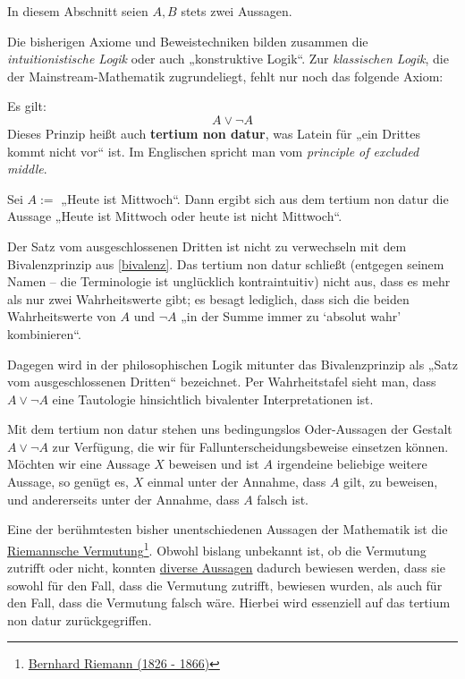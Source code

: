 In diesem Abschnitt seien $A,B$ stets zwei Aussagen.

Die bisherigen Axiome und Beweistechniken bilden zusammen die \emph{intuitionistische Logik} oder auch „konstruktive Logik“. Zur \emph{klassischen Logik}, die der Mainstream-Mathematik zugrundeliegt, fehlt nur noch das folgende Axiom:


\begin{axiom} \label{excludedmiddle}  
    Es gilt:
        \[ A\lor \neg A \]
    Dieses Prinzip heißt auch \textbf{tertium non datur}, was Latein für „ein Drittes kommt nicht vor“ ist. Im Englischen spricht man vom \emph{principle of excluded middle}.
\end{axiom}


\begin{bsp}
    Sei $A:=$ „Heute ist Mittwoch“. Dann ergibt sich aus dem tertium non datur die Aussage „Heute ist Mittwoch oder heute ist nicht Mittwoch“.
\end{bsp}


\begin{bem}
    Der Satz vom ausgeschlossenen Dritten ist nicht zu verwechseln mit dem Bivalenzprinzip aus \cref{bivalenz}. Das tertium non datur schließt (entgegen seinem Namen -- die Terminologie ist unglücklich kontraintuitiv) nicht aus, dass es mehr als nur zwei Wahrheitswerte gibt; es besagt lediglich, dass sich die beiden Wahrheitswerte von $A$ und $\neg A$ „in der Summe immer zu `absolut wahr' kombinieren“.
    
    Dagegen wird in der philosophischen Logik mitunter das Bivalenzprinzip als „Satz vom ausgeschlossenen Dritten“ bezeichnet. Per Wahrheitstafel sieht man, dass $A\lor \neg A$ eine Tautologie hinsichtlich bivalenter Interpretationen ist.
\end{bem}


\begin{bem}
    Mit dem tertium non datur stehen uns bedingungslos Oder-Aussagen der Gestalt $A\lor \neg A$ zur Verfügung, die wir für Fallunterscheidungsbeweise einsetzen können. Möchten wir eine Aussage $X$ beweisen und ist $A$ irgendeine beliebige weitere Aussage, so genügt es, $X$ einmal unter der Annahme, dass $A$ gilt, zu beweisen, und andererseits unter der Annahme, dass $A$ falsch ist.
    
    Eine der berühmtesten bisher unentschiedenen Aussagen der Mathematik ist die \href{https://de.wikipedia.org/wiki/Riemannsche_Vermutung}{Riemannsche Vermutung}\footnote{\href{https://de.wikipedia.org/wiki/Bernhard_Riemann}{Bernhard Riemann (1826 - 1866)}}. Obwohl bislang unbekannt ist, ob die Vermutung zutrifft oder nicht, konnten \href{https://en.wikipedia.org/wiki/Riemann_hypothesis#Excluded_middle}{diverse Aussagen} dadurch bewiesen werden, dass sie sowohl für den Fall, dass die Vermutung zutrifft, bewiesen wurden, als auch für den Fall, dass die Vermutung falsch wäre. Hierbei wird essenziell auf das tertium non datur zurückgegriffen.
\end{bem}


